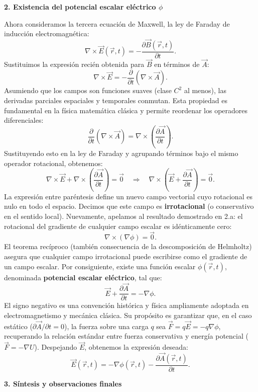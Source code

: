 \documentclass[a4paper]{article}
\begin{document}
\vspace{0.3cm}
\noindent\textbf{2. Existencia del potencial escalar eléctrico $\phi$}

Ahora consideramos la tercera ecuación de Maxwell, la ley de Faraday de inducción electromagnética:
$$
\nabla \times \vec{E}(\vec{r},t) = -\frac{\partial \vec{B}(\vec{r},t)}{\partial t}.
$$
Sustituimos la expresión recién obtenida para $\vec{B}$ en términos de $\vec{A}$:
$$
\nabla \times \vec{E} = -\frac{\partial}{\partial t}(\nabla \times \vec{A}).
$$
Asumiendo que los campos son funciones suaves (clase $C^2$ al menos), las derivadas parciales espaciales y temporales conmutan. Esta propiedad es fundamental en la física matemática clásica y permite reordenar los operadores diferenciales:
$$
\frac{\partial}{\partial t}(\nabla \times \vec{A}) = \nabla \times \left(\frac{\partial \vec{A}}{\partial t}\right).
$$
Sustituyendo esto en la ley de Faraday y agrupando términos bajo el mismo operador rotacional, obtenemos:
$$
\nabla \times \vec{E} + \nabla \times \left(\frac{\partial \vec{A}}{\partial t}\right) = \vec{0} \quad \Rightarrow \quad \nabla \times \left( \vec{E} + \frac{\partial \vec{A}}{\partial t} \right) = \vec{0}.
$$
La expresión entre paréntesis define un nuevo campo vectorial cuyo rotacional es nulo en todo el espacio. Decimos que este campo es \textbf{irrotacional} (o conservativo en el sentido local). Nuevamente, apelamos al resultado demostrado en 2.a: el rotacional del gradiente de cualquier campo escalar es idénticamente cero:
$$
\nabla \times (\nabla \phi) = \vec{0}.
$$
El teorema recíproco (también consecuencia de la descomposición de Helmholtz) asegura que cualquier campo irrotacional puede escribirse como el gradiente de un campo escalar. Por consiguiente, existe una función escalar $\phi(\vec{r},t)$, denominada \textbf{potencial escalar eléctrico}, tal que:
$$
\vec{E} + \frac{\partial \vec{A}}{\partial t} = -\nabla \phi.
$$
El signo negativo es una convención histórica y física ampliamente adoptada en electromagnetismo y mecánica clásica. Su propósito es garantizar que, en el caso estático ($\partial \vec{A}/\partial t = 0$), la fuerza sobre una carga $q$ sea $\vec{F} = q\vec{E} = -q\nabla \phi$, recuperando la relación estándar entre fuerza conservativa y energía potencial ($\vec{F} = -\nabla U$). Despejando $\vec{E}$, obtenemos la expresión deseada:
$$
\vec{E}(\vec{r},t) = -\nabla \phi(\vec{r},t) - \frac{\partial \vec{A}(\vec{r},t)}{\partial t}.
$$

\vspace{0.3cm}
\noindent\textbf{3. Síntesis y observaciones finales}
\end{document}
